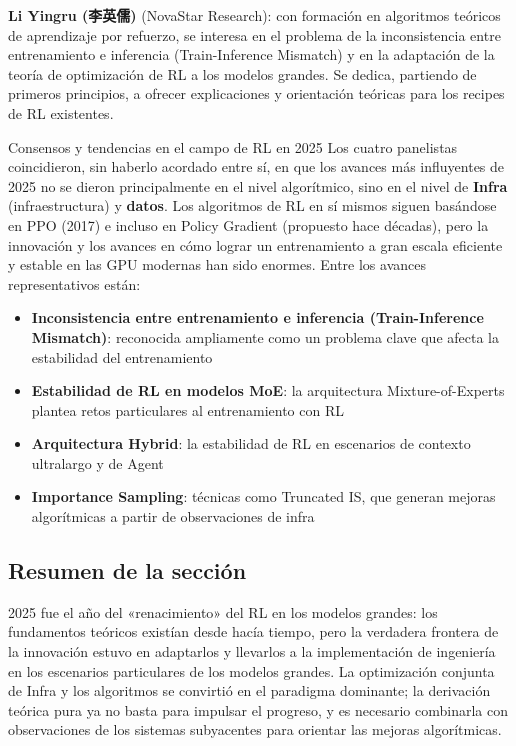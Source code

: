 \documentclass[a4paper]{article}
\begin{document}
\textbf{Li Yingru (李英儒)} (NovaStar Research): con formación en algoritmos teóricos de aprendizaje por refuerzo, se interesa en el problema de la inconsistencia entre entrenamiento e inferencia (Train-Inference Mismatch) y en la adaptación de la teoría de optimización de RL a los modelos grandes. Se dedica, partiendo de primeros principios, a ofrecer explicaciones y orientación teóricas para los recipes de RL existentes.

\begin{knowledgebox}{Consensos y tendencias en el campo de RL en 2025}
Los cuatro panelistas coincidieron, sin haberlo acordado entre sí, en que los avances más influyentes de 2025 no se dieron principalmente en el nivel algorítmico, sino en el nivel de \textbf{Infra} (infraestructura) y \textbf{datos}. Los algoritmos de RL en sí mismos siguen basándose en PPO (2017) e incluso en Policy Gradient (propuesto hace décadas), pero la innovación y los avances en cómo lograr un entrenamiento a gran escala eficiente y estable en las GPU modernas han sido enormes. Entre los avances representativos están:
\begin{itemize}
    \item \textbf{Inconsistencia entre entrenamiento e inferencia (Train-Inference Mismatch)}: reconocida ampliamente como un problema clave que afecta la estabilidad del entrenamiento
    \item \textbf{Estabilidad de RL en modelos MoE}: la arquitectura Mixture-of-Experts plantea retos particulares al entrenamiento con RL
    \item \textbf{Arquitectura Hybrid}: la estabilidad de RL en escenarios de contexto ultralargo y de Agent
    \item \textbf{Importance Sampling}: técnicas como Truncated IS, que generan mejoras algorítmicas a partir de observaciones de infra
\end{itemize}
\end{knowledgebox}

\subsection{Resumen de la sección}

2025 fue el año del «renacimiento» del RL en los modelos grandes: los fundamentos teóricos existían desde hacía tiempo, pero la verdadera frontera de la innovación estuvo en adaptarlos y llevarlos a la implementación de ingeniería en los escenarios particulares de los modelos grandes. La optimización conjunta de Infra y los algoritmos se convirtió en el paradigma dominante; la derivación teórica pura ya no basta para impulsar el progreso, y es necesario combinarla con observaciones de los sistemas subyacentes para orientar las mejoras algorítmicas.
\end{document}
